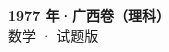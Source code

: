 \documentclass[zihao=-4, a4paper]{ctexart}
\begin{document}
\begin{center}
  {\Large\bfseries 1977 年·广西卷（理科）}\\[4pt]
  {\large 数学 · 试题版}
\end{center}
\medskip
{}

\end{document}

